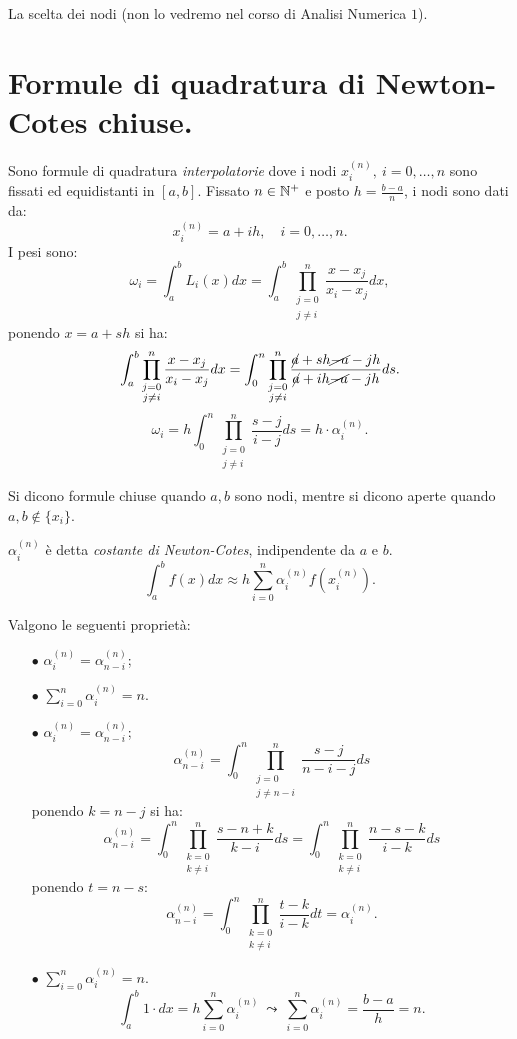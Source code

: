 La scelta dei nodi (non lo vedremo nel corso di Analisi Numerica $1$).

\section{Formule di quadratura di Newton-Cotes chiuse.}

Sono formule di quadratura \emph{interpolatorie} dove i nodi $x_i^{(n)}, \ i=0,
\ldots, n$
sono fissati ed equidistanti in $[a,b]$. Fissato $n \in \mathbb{N}^+$ e posto
$h = \frac{b-a}{n}$, i nodi sono dati da:
\[x_i^{(n)} = a+ih, \quad i = 0, \ldots, n.\]
I pesi sono:
\[\omega_i = \int_a^bL_i(x)dx = \int_a^b\prod_{\substack{j = 0 \\ j \neq i}}^n 
\frac{x-x_j}{x_i-x_j}dx,\]
ponendo $x = a+sh$ si ha: 
\[
\int_a^b\prod_{\substack{j = 0 \\ j \neq i}}^n 
\frac{x-x_j}{x_i-x_j}dx =
\int_0^n\prod_{\substack{j = 0 \\ j \neq i}}^n 
\frac{\cancel{a} +sh \cancel{-a} -jh}{\cancel{a} +ih \cancel{-a} -jh}
ds.\]
\[
\omega_i = h \int_0^n\prod_{\substack{j = 0 \\ j \neq i}}^n \frac{s-j}{i-j}ds
= h \cdot \alpha_i^{(n)}.
\]

\begin{notabene}
Si dicono formule chiuse quando $a,b$ sono nodi, mentre si dicono aperte
quando $a,b \notin \{x_i\}$.
\end{notabene}

\begin{defi}
$\alpha_i^{(n)}$ è detta \emph{costante di Newton-Cotes}, indipendente da $a$ 
e $b$.
\[\int_a^bf(x)dx \approx h \sum_{i=0}^n \alpha_i^{(n)} f(x_i^{(n)}).\]
\end{defi}

\begin{osse}
Valgono le seguenti proprietà:
\begin{itemize}
\item[$\bullet$]$\alpha_i^{(n)} = \alpha_{n-i}^{(n)}$;
\item[$\bullet$]$\sum_{i=0}^n\alpha_i^{(n)} = n$.
\end{itemize}
\end{osse}
\begin{dimo}
\begin{itemize}
\item[$\bullet$]$\alpha_i^{(n)} = \alpha_{n-i}^{(n)}$;
\[\alpha_{n-i}^{(n)} = \int_0^n\prod_{\substack{j = 0 \\ j \neq n-i}}^n 
\frac{s-j}{n-i-j}ds
\]
ponendo $k = n-j$ si ha:
\[\alpha_{n-i}^{(n)} =\int_0^n\prod_{\substack{k = 0 \\ k \neq i}}^n \frac{s-n+k}{k-i}
ds
= \int_0^n\prod_{\substack{k = 0 \\ k \neq i}}^n \frac{n-s-k}{i-k}ds\]
ponendo $t= n-s$:
\[\alpha_{n-i}^{(n)} = \int_0^n\prod_{\substack{k = 0 \\ k \neq i}}^n \frac{t-k}{i-k}
dt
= \alpha_{i}^{(n)}.\]
\item[$\bullet$]$\sum_{i=0}^n\alpha_i^{(n)} = n$.
\[\int_a^b1\cdot dx = h \sum_{i=0}^n \alpha_i^{(n)}\ \leadsto\ \sum_{i=0}^n 
\alpha_i^{(n)} =
\frac{b-a}{h} = n. \]
\end{itemize}
\end{dimo}

